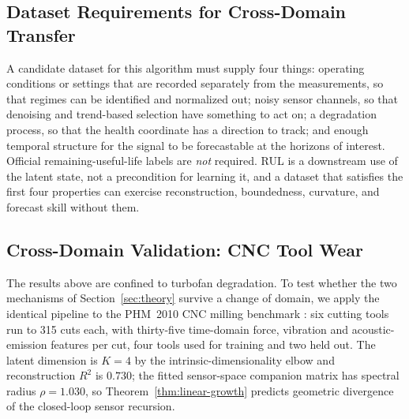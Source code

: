\documentclass[a4paper,fleqn]{cas-sc}
\begin{document}
\subsection{Dataset Requirements for Cross-Domain Transfer}
\label{sec:dataset-criteria}
\label{app:dataset-criteria}

A candidate dataset for this algorithm must supply four things: operating
conditions or settings that are recorded separately from the measurements, so
that regimes can be identified and normalized out; noisy sensor channels, so
that denoising and trend-based selection have something to act on; a
degradation process, so that the health coordinate has a direction to track;
and enough temporal structure for the signal to be forecastable at the horizons
of interest. Official remaining-useful-life labels are \emph{not} required. RUL
is a downstream use of the latent state, not a precondition for learning it,
and a dataset that satisfies the first four properties can exercise
reconstruction, boundedness, curvature, and forecast skill without them.


\subsection{Cross-Domain Validation: CNC Tool Wear}
\label{sec:milling}

The results above are confined to turbofan degradation. To test whether the two
mechanisms of Section~\ref{sec:theory} survive a change of domain, we apply the
identical pipeline to the PHM~2010 CNC milling benchmark \citep{phm2010}: six
cutting tools run
to 315 cuts each, with thirty-five time-domain force, vibration and
acoustic-emission features per cut, four tools used for training and two held
out. The latent dimension is $K{=}4$ by the intrinsic-dimensionality elbow and
reconstruction $R^2$ is $0.730$; the fitted sensor-space companion matrix has
spectral radius $\rho=1.030$, so Theorem~\ref{thm:linear-growth} predicts
geometric divergence of the closed-loop sensor recursion.
\end{document}
